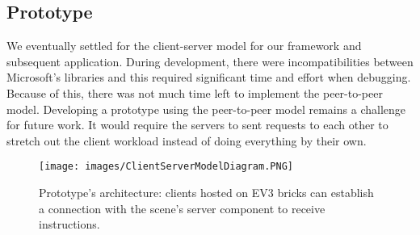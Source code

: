 
\subsection{Prototype}
We eventually settled for the client-server model for our framework and subsequent application. During development, there were incompatibilities between Microsoft's libraries and this required significant time and effort when debugging. Because of this, there was not much time left to implement the peer-to-peer model. Developing a prototype using the peer-to-peer model remains a challenge for future work. It would require the servers to sent requests to each other to stretch out the client workload instead of doing everything by their own.

\begin{figure}[!htb]
	\texttt{[image: images/ClientServerModelDiagram.PNG]}
	\captionsetup{width=1.0\textwidth}
	\centering
	\caption{Prototype's architecture: clients hosted on EV3 bricks can establish a connection with the scene's server component to receive instructions.} 
\end{figure}

 

